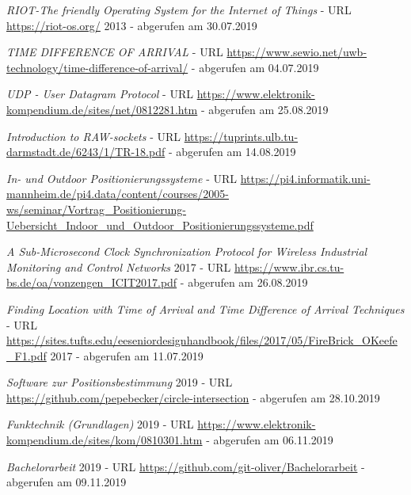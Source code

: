 \begin{thebibliography}{}
	\textit{RIOT-The friendly Operating System for the Internet of Things} - URL \url{https://riot-os.org/} 2013 - abgerufen am 30.07.2019	


	\textit{TIME DIFFERENCE OF ARRIVAL} - URL \url{https://www.sewio.net/uwb-technology/time-difference-of-arrival/} - abgerufen am 04.07.2019	


	\textit{UDP - User Datagram Protocol} - URL \url{https://www.elektronik-kompendium.de/sites/net/0812281.htm} - abgerufen am 25.08.2019	

	\textit{Introduction to RAW-sockets} - URL \url{https://tuprints.ulb.tu-darmstadt.de/6243/1/TR-18.pdf} - abgerufen am 14.08.2019	

	\textit{In- und Outdoor
Positionierungssysteme} - URL \url{https://pi4.informatik.uni-mannheim.de/pi4.data/content/courses/2005-ws/seminar/Vortrag_Positionierung-Uebersicht_Indoor_und_Outdoor_Positionierungssysteme.pdf} 

	\textit{A Sub-Microsecond Clock Synchronization Protocol for Wireless Industrial Monitoring and Control Networks} 2017 - URL \url{https://www.ibr.cs.tu-bs.de/oa/vonzengen_ICIT2017.pdf} - abgerufen am 26.08.2019

 
	\textit{Finding Location with Time of Arrival and Time Difference of Arrival Techniques} - URL \url{https://sites.tufts.edu/eeseniordesignhandbook/files/2017/05/FireBrick_OKeefe_F1.pdf} 2017 - abgerufen am 11.07.2019	
	


	\textit{Software zur Positionsbestimmung} 2019 - URL \url{https://github.com/pepebecker/circle-intersection} - abgerufen am 28.10.2019	
	
	
	\textit{Funktechnik (Grundlagen)} 2019 - URL \url{https://www.elektronik-kompendium.de/sites/kom/0810301.htm} - abgerufen am 06.11.2019	
	
\textit{Bachelorarbeit} 2019 - URL \url{https://github.com/git-oliver/Bachelorarbeit} - abgerufen am 09.11.2019	
	
	
	
	
	
	
	
	
\end{thebibliography}
